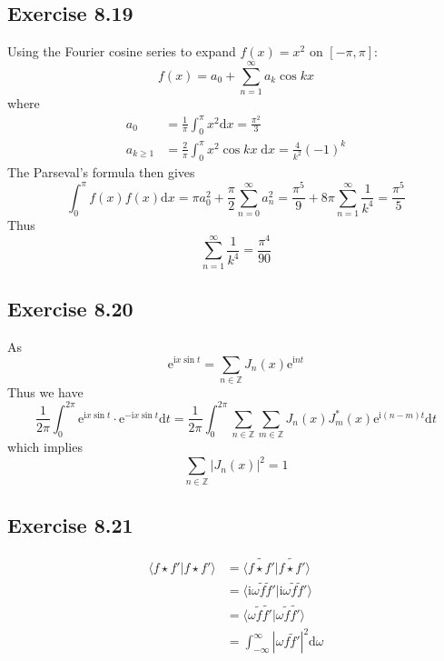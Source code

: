 \documentclass[]{ctexart}
\begin{document}
\subsection{Exercise 8.19}
Using the Fourier cosine series to expand $f(x)=x^2$ on $[-\pi,\pi]$: 
\begin{equation*}
f(x)=a_0+\sum_{n=1}^\infty a_k\cos kx
\end{equation*}
where 
\begin{align*}
a_0&=\frac{1}{\pi}\int_0^\pi x^2\mathrm{d}x=\frac{\pi^2}{3}\\
a_{k\ge 1}&=\frac{2}{\pi}\int_0^\pi x^2\cos kx\;\mathrm{d}x=\frac{4}{k^2}(-1)^k
\end{align*}
The Parseval's formula then gives 
\begin{equation*}
\int_0^\pi f(x)f(x)\mathrm{d}x=\pi a_0^2+\frac{\pi}{2}\sum_{n=0}^\infty a_n^2=\frac{\pi^5}{9}+8\pi\sum_{n=1}^\infty\frac{1}{k^4}=\frac{\pi^5}{5}
\end{equation*}
Thus 
\begin{equation*}
\sum_{n=1}^\infty\frac{1}{k^4}=\frac{\pi^4}{90}
\end{equation*}

\subsection{Exercise 8.20}
As 
\begin{equation*}
\mathrm{e}^{\mathrm{i}x\sin t}=\sum_{n\in\mathbb Z}J_n(x)\mathrm{e}^{\mathrm{i}nt}
\end{equation*}
Thus we have 
\begin{equation*}
\frac{1}{2\pi}\int_0^{2\pi}\mathrm{e}^{\mathrm{i}x\sin t}\cdot\mathrm{e}^{-\mathrm{i}x\sin t}\mathrm{d}t=\frac{1}{2\pi}\int_0^{2\pi}\sum_{n\in\mathbb Z}\sum_{m\in\mathbb Z}J_n(x)J^*_m(x)\mathrm{e}^{\mathrm{i}(n-m)t}\mathrm{d}t
\end{equation*}
which implies 
\begin{equation*}
\sum_{n\in\mathbb Z}|J_n(x)|^{2}=1
\end{equation*}

\subsection{Exercise 8.21}
\begin{align*}
\langle f\star f'|f\star f'\rangle&=\langle\widetilde{f\star f'}|\widetilde{f\star f'}\rangle\\
&=\langle \mathrm{i}\omega\tilde{f}\tilde{f}'|\mathrm{i}\omega\tilde{f}\tilde{f}'\rangle\\
&=\langle\omega\tilde{f}\tilde{f'}|\omega\tilde{f}\tilde{f'}\rangle\\
&=\int_{-\infty}^\infty|\omega f\tilde{f}'|^2\mathrm{d}\omega
\end{align*}
\end{document}
